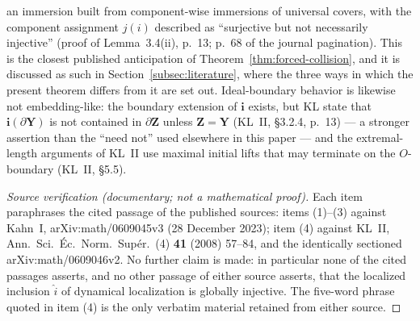 \begin{remark}
\begin{enumerate}
an immersion built from component-wise immersions of universal covers,
with the component assignment \(j(i)\) described as ``surjective but
not necessarily injective'' (proof of Lemma~3.4(ii), p.~13; p.~68 of
the journal pagination).  This is the closest published anticipation of
Theorem~\ref{thm:forced-collision}, and it is discussed as such in
Section~\ref{subsec:literature}, where the three ways in which the
present theorem differs from it are set out.  Ideal-boundary behavior
is likewise not embedding-like: the boundary extension of
\(\mathbf i\) exists, but KL state that
\(\mathbf i(\partial\mathbf Y)\) is not contained in
\(\partial\mathbf Z\) unless \(\mathbf Z=\mathbf Y\)
(KL~II, \S3.2.4, p.~13) --- a stronger assertion than the ``need not''
used elsewhere in this paper --- and the extremal-length
arguments of KL~II use maximal initial lifts that may terminate on the
\(O\)-boundary (KL~II, \S5.5).
\end{enumerate}
\end{remark}

\begin{proof}[Source verification (documentary; not a mathematical proof)]
Each item paraphrases the cited passage of the published sources:
items (1)--(3) against Kahn~I, arXiv:math/0609045v3 (28 December 2023);
item (4) against KL~II, Ann.\ Sci.\ \'Ec.\ Norm.\ Sup\'er.\ (4)
\textbf{41} (2008) 57--84, and the identically sectioned
arXiv:math/0609046v2.  No further claim is made: in
particular none of the cited passages asserts, and no other passage of
either source asserts, that the localized inclusion
\(\widehat i\) of dynamical localization is globally injective.  The
five-word phrase quoted in item (4) is the only verbatim material
retained from either source.
\end{proof}

